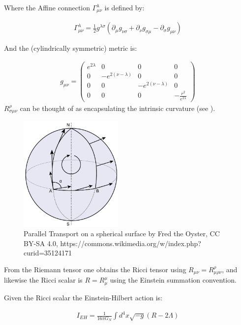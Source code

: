 \documentclass[12pt]{article}
\begin{document}
Where the Affine connection $\Gamma_{\mu\nu}^{\lambda}$ is defined by:

\begin{align}
  \Gamma_{\mu\nu}^{\lambda}=\frac{1}{2}g^{\lambda\sigma}\left(\partial_{\mu}g_{\nu\sigma}+\partial_{\nu}g_{\sigma\mu}-\partial_{\sigma}g_{\mu\nu}\right)
\end{align}

And the (cylindrically symmetric) metric is:

\begin{align}
  g_{\mu\nu}=\left(\begin{array}{cccc}
    e^{2\lambda} & 0 & 0 & 0\\
    0 & -e^{2\left(\nu-\lambda\right)} & 0 & 0\\
    0 & 0 & -e^{2\left(\nu-\lambda\right)} & 0\\
    0 & 0 & 0 & -\frac{r^{2}}{e^{2\lambda}}
    \end{array}\right)
\end{align}
$R^{\rho}_{\sigma\mu\nu}$ can be thought of as encapsulating the intrinsic curvature (see ).
\begin{figure}
  \centering
  \includegraphics[width=2in]{Parallel_Transport.pdf}
  \caption{Parallel Transport on a spherical surface by Fred the Oyster, CC BY-SA 4.0, https://commons.wikimedia.org/w/index.php?curid=35124171 \label{parallel-transport-figure}}
\end{figure}

From the Riemann tensor one obtains the Ricci tensor using $R_{\mu\nu}=R^{\rho}_{\mu\rho\nu}$, and likewise the Ricci scalar is $R=R^{\mu}_{\mu}$ using the Einstein summation
convention.

Given the Ricci scalar the Einstein-Hilbert action is:

\begin{align}
I_{EH}=\frac{1}{16\pi G_{N}}\int d^{4}x\sqrt{-g}(R-2\Lambda)
\end{align}
\end{document}
